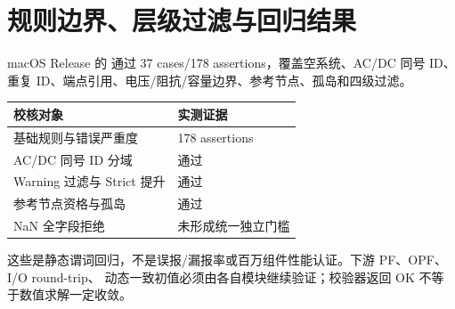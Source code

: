 \section{规则边界、层级过滤与回归结果}\label{sec:validation-numerical}

macOS Release 的  通过 37 cases/178 assertions，覆盖空系统、AC/DC
同号 ID、重复 ID、端点引用、电压/阻抗/容量边界、参考节点、孤岛和四级过滤。

\begin{center}\small
\begin{tabular}{@{}L{6.5cm}L{5.0cm}@{}}
\toprule 校核对象 & 实测证据\\\midrule
基础规则与错误严重度 & 178 assertions\\
AC/DC 同号 ID 分域 & 通过\\
Warning 过滤与 Strict 提升 & 通过\\
参考节点资格与孤岛 & 通过\\
NaN 全字段拒绝 & 未形成统一独立门槛\\
\bottomrule
\end{tabular}
\end{center}

这些是静态谓词回归，不是误报/漏报率或百万组件性能认证。下游 PF、OPF、I/O round-trip、
动态一致初值必须由各自模块继续验证；校验器返回 OK 不等于数值求解一定收敛。
